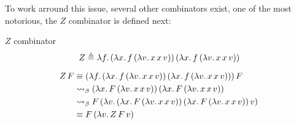 To work arround this issue, several other combinators exist, one of the most notorious, the $Z$ combinator is defined next:
\begin{definition} $Z$ combinator
\[
  Z \triangleq \lambda f.\, (\lambda x.\, f\, (\lambda v.\, x\, x\, v))\, (\lambda x.\, f\, (\lambda v.\, x\, x\, v))
\]
\end{definition}
\begin{example}
  \[
    \begin{aligned}
      Z \, F &\equiv (\lambda f.\, (\lambda x.\, f\, (\lambda v.\, x\, x\, v))\, (\lambda x.\, f\, (\lambda v.\, x\, x\, v)))\, F \\
             &\mathrel{\leadsto}_\beta (\lambda x.\, F\, (\lambda v.\, x\, x\, v))\, (\lambda x.\, F\, (\lambda v.\, x\, x\, v)) \\
             &\mathrel{\leadsto}_\beta F\, (\lambda v.\, (\lambda x.\, F\, (\lambda v.\, x\, x\, v))\, (\lambda x.\, F\, (\lambda v.\, x\, x\, v))\, v)\, \\
             &\equiv F\, (\lambda v.\, Z \, F \, v)\, \\
    \end{aligned}
  \]
\end{example}
